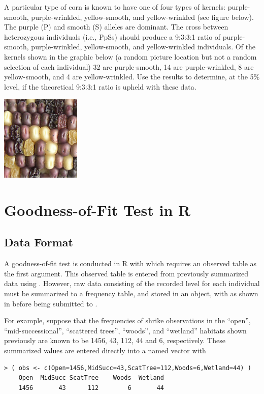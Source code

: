 \documentclass[10pt,openany]{book}\usepackage[]{graphicx}\usepackage[]{color}
\makeatletter
\newenvironment{kframe}{%
 \def\at@end@of@kframe{}%
 \ifinner\ifhmode%
  \def\at@end@of@kframe{\end{minipage}}%
  \begin{minipage}{\columnwidth}%
 \fi\fi%
 \def\FrameCommand##1{\hskip\@totalleftmargin \hskip-\fboxsep
 \colorbox{shadecolor}{##1}\hskip-\fboxsep
     \hskip-\linewidth \hskip-\@totalleftmargin \hskip\columnwidth}%
 \MakeFramed {\advance\hsize-\width
   \@totalleftmargin\z@ \linewidth\hsize
   \@setminipage}}%
 {\par\unskip\endMakeFramed%
 \at@end@of@kframe}
\newenvironment{knitrout}{}{} %
\makeatother
\begin{document}
\begin{exsection}
  \item \label{revex:ChiGOFMendels1} A particular type of corn is known to have one of four types of kernels: purple-smooth, purple-wrinkled, yellow-smooth, and yellow-wrinkled (see figure below).  The purple (P) and smooth (S) alleles are dominant.  The cross between heterozygous individuals (i.e., PpSs) should produce a 9:3:3:1 ratio of purple-smooth, purple-wrinkled, yellow-smooth, and yellow-wrinkled individuals.  Of the kernels shown in the graphic below (a random picture location but not a random selection of each individual) 32 are purple-smooth, 14 are purple-wrinkled, 8 are yellow-smooth, and 4 are yellow-wrinkled.  Use the results to determine, at the 5\% level, if the theoretical 9:3:3:1 ratio is upheld with these data. 
    \begin{center}
      \includegraphics[width=1.5in]{Figs/ChiGOF_corn.jpg}
    \end{center}
\end{exsection}

\section{Goodness-of-Fit Test in R}
\subsection{Data Format}
A goodness-of-fit test is conducted in R with  which requires an observed table as the first argument.  This observed table is entered from previously summarized data using .  However, raw data consisting of the recorded level for each individual must be summarized to a frequency table, and stored in an object, with  as shown in  before being submitted to .

For example, suppose that the frequencies of shrike observations in the ``open'', ``mid-successional'', ``scattered trees'', ``woods'', and ``wetland'' habitats shown previously are known to be 1456, 43, 112, 44 and 6, respectively.  These summarized values are entered directly into a named vector with
\begin{knitrout}
\color{fgcolor}\begin{kframe}
\begin{verbatim}
> ( obs <- c(Open=1456,MidSucc=43,ScatTree=112,Woods=6,Wetland=44) )
    Open  MidSucc ScatTree    Woods  Wetland 
    1456       43      112        6       44 
\end{verbatim}
\end{kframe}
\end{knitrout}
\end{document}
